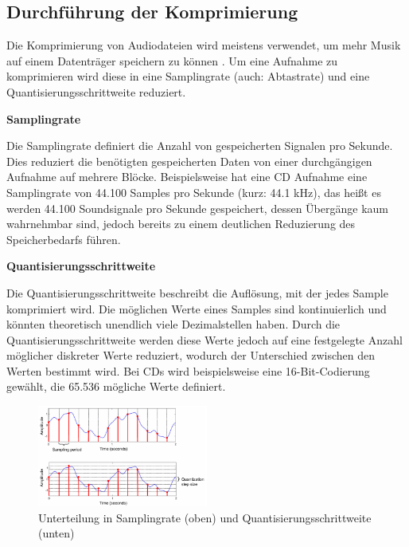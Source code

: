 %
\subsection{Durchführung der Komprimierung}
\label{compression}
%

Die Komprimierung von Audiodateien wird meistens verwendet, um mehr Musik auf einem Datenträger speichern zu können \parencite{what_is_audio_compression}. Um eine Aufnahme zu komprimieren wird diese in eine Samplingrate (auch: Abtastrate) und eine Quantisierungsschrittweite reduziert.

\par

%
\textbf{Samplingrate}
%

Die Samplingrate definiert die Anzahl von gespeicherten Signalen pro Sekunde. Dies reduziert die benötigten gespeicherten Daten von einer durchgängigen Aufnahme auf mehrere Blöcke. Beispielsweise hat eine CD Aufnahme eine Samplingrate von 44.100 Samples pro Sekunde (kurz: 44.1 kHz), das heißt es werden 44.100 Soundsignale pro Sekunde gespeichert, dessen Übergänge kaum wahrnehmbar sind, jedoch bereits zu einem deutlichen Reduzierung des Speicherbedarfs führen.

%
\textbf{Quantisierungsschrittweite}
%

Die Quantisierungsschrittweite beschreibt die Auflösung, mit der jedes Sample komprimiert wird. Die möglichen Werte eines Samples sind kontinuierlich und könnten theoretisch unendlich viele Dezimalstellen haben. Durch die Quantisierungsschrittweite werden diese Werte jedoch auf eine festgelegte Anzahl möglicher diskreter Werte reduziert, wodurch der Unterschied zwischen den Werten bestimmt wird. Bei CDs wird beispielsweise eine 16-Bit-Codierung gewählt, die 65.536 mögliche Werte definiert.

%
\begin{figure}[h]
    \includegraphics[width=0.5\textwidth]{images/Samplingrate_Quantisierungsgröße.PNG}
    \caption{Unterteilung in Samplingrate (oben) und Quantisierungsschrittweite (unten)}
    \label{fig:samplingrate}
\end{figure}
%

